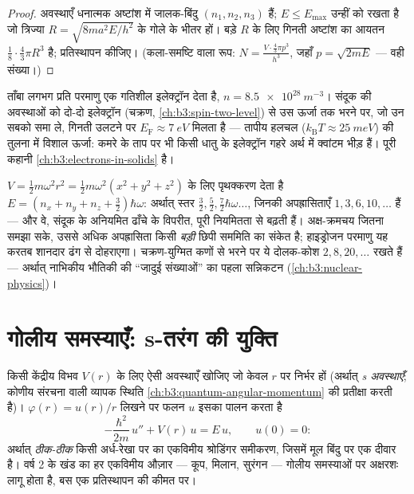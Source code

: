 \begin{proof}
अवस्थाएँ धनात्मक अष्टांश में जालक-बिंदु $(n_1, n_2, n_3)$ हैं;
$E \le E_{\max}$ उन्हीं को रखता है जो त्रिज्या $R =
\sqrt{8ma^2E/h^2}$ के गोले के भीतर हों। बड़े $R$ के लिए गिनती अष्टांश
का आयतन $\tfrac18\cdot\tfrac43\pi R^3$ है; प्रतिस्थापन कीजिए।
(कला-समष्टि वाला रूप: $N = \tfrac{V\cdot\frac43\pi p^3}{h^3}$, जहाँ
$p = \sqrt{2mE}$ --- वही संख्या।)
\end{proof}

\begin{example}\label{ex:b3:schrodinger-three-dimensions:metal}
ताँबा लगभग प्रति परमाणु एक गतिशील इलेक्ट्रॉन देता है, $n =
\qty{8.5e28}{m^{-3}}$। संदूक की अवस्थाओं को दो-दो इलेक्ट्रॉन
(चक्रण, \cref{ch:b3:spin-two-level}) से उस ऊर्जा तक भरने पर, जो उन
सबको समा ले, गिनती उलटने पर $E_{\text{F}}
\approx \qty{7}{eV}$ मिलता है --- तापीय हलचल
($k_{\text{B}}T \approx \qty{25}{meV}$) की तुलना में विशाल ऊर्जा:
कमरे के ताप पर भी किसी धातु के इलेक्ट्रॉन गहरे अर्थ में क्वांटम भीड़
हैं। पूरी कहानी \cref{ch:b3:electrons-in-solids} है।
\end{example}

\begin{example}[समदैशिक दोलक]\label{ex:b3:schrodinger-three-dimensions:oscillator}
$V = \tfrac12 m\omega^2r^2 = \tfrac12 m\omega^2(x^2 + y^2 +
z^2)$ के लिए पृथक्करण देता है $E = (n_x + n_y + n_z + \tfrac32)\hbar\omega$:
अर्थात् स्तर $\tfrac32, \tfrac52, \tfrac72\hbar\omega\ldots$, जिनकी
अपह्रासिताएँ $1, 3, 6, 10, \dots$ हैं --- और वे, संदूक के अनियमित
ढाँचे के विपरीत, पूरी नियमितता से बढ़ती हैं। अक्ष-क्रमचय जितना समझा
सके, उससे अधिक अपह्रासिता किसी \emph{बड़ी} छिपी सममिति का संकेत है;
हाइड्रोजन परमाणु यह करतब शानदार ढंग से दोहराएगा।
चक्रण-युग्मित कणों से भरने पर ये दोलक-कोश $2,
8, 20, \dots$ रखते हैं --- अर्थात् नाभिकीय भौतिकी की ``जादुई संख्याओं''
का पहला सन्निकटन (\cref{ch:b3:nuclear-physics})।
\end{example}

\section{गोलीय समस्याएँ: s-तरंग की युक्ति}

\begin{proposition}\label{prop:b3:schrodinger-three-dimensions:swave}
किसी केंद्रीय विभव $V(r)$ के लिए ऐसी अवस्थाएँ खोजिए जो केवल $r$ पर
निर्भर हों (अर्थात् \emph{s अवस्थाएँ}; कोणीय संरचना वाली व्यापक
स्थिति \cref{ch:b3:quantum-angular-momentum} की प्रतीक्षा करती है)।
$\varphi(r) = u(r)/r$ लिखने पर फलन $u$ इसका पालन करता है
\[
-\frac{\hbar^2}{2m}\,u'' + V(r)\,u = E\,u ,
\qquad u(0) = 0 :
\]
अर्थात् \emph{ठीक-ठीक} किसी अर्ध-रेखा पर का एकविमीय श्रोडिंगर
समीकरण, जिसमें मूल बिंदु पर एक दीवार है। वर्ष 2 के खंड का हर
एकविमीय औज़ार --- कूप, मिलान, सुरंगन --- गोलीय समस्याओं पर
अक्षरशः लागू होता है, बस एक प्रतिस्थापन की कीमत पर।
\end{proposition}

